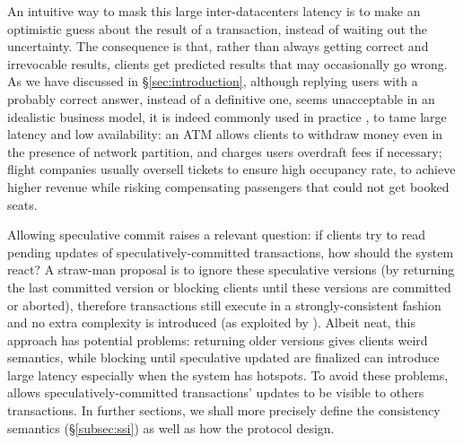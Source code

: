 An intuitive way to mask this large inter-datacenters latency is to make an optimistic guess about the result of a transaction, instead of waiting out the uncertainty. The consequence is that, rather than always getting correct and irrevocable results, clients get predicted results that may occasionally go wrong. As we have discussed in \S \ref{sec:introduction}, although replying users with a probably correct answer, instead of a definitive one, seems unacceptable in an idealistic business model, it is indeed commonly used in practice \cite{helland2009building, brewer2012cap}, to tame large latency and low availability: an ATM allows clients to withdraw money even in the presence of network partition, and charges users overdraft fees if necessary; flight companies usually oversell tickets to ensure high occupancy rate, to achieve higher revenue while risking compensating passengers that could not get booked seats.

Allowing speculative commit raises a relevant question: if clients try to read pending updates of speculatively-committed transactions, how should the system react? A straw-man proposal is to ignore these speculative versions (by returning the last committed version or blocking clients until these versions are committed or aborted), therefore transactions still execute in a strongly-consistent fashion and no extra complexity is introduced (as exploited by \cite{pang2014planet}). Albeit neat, this approach has potential problems: returning older versions gives clients weird semantics, while blocking until speculative updated are finalized can introduce large latency especially when the system has hotspots. To avoid these problems, \specula allows speculatively-committed transactions' updates to be visible to others transactions. In further sections, we shall more precisely define the consistency semantics (\S \ref{subsec:ssi}) as well as how the protocol design.

